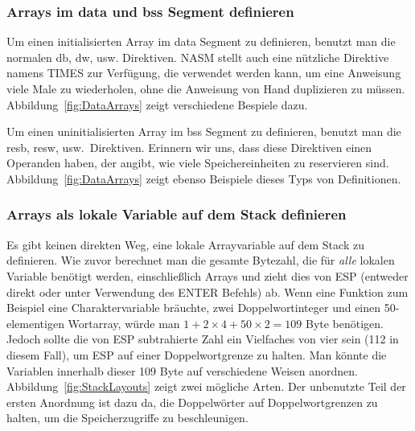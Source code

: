 \subsubsection{Arrays im {\code data} und {\code bss} Segment definieren
}

Um einen initialisierten Array im {\code data} Segment zu
definieren, benutzt man die normalen {\code db}, {\code dw}, usw.\/
Direktiven. NASM stellt auch eine
n\"{u}tzliche Direktive namens {\code TIMES}  zur
Verf\"{u}gung, die verwendet werden kann, um eine Anweisung viele Male
zu wiederholen, ohne die Anweisung von Hand duplizieren zu m\"{u}ssen.
Abbildung~\ref{fig:DataArrays} zeigt verschiedene Bespiele dazu.

Um einen uninitialisierten Array im {\code bss} Segment zu
definieren, benutzt man die {\code resb}, {\code resw},
 usw.\ Direktiven. Erinnern wir uns,
dass diese Direktiven einen Operanden haben, der angibt, wie viele
Speichereinheiten zu reservieren sind.
Abbildung~\ref{fig:DataArrays} zeigt ebenso Beispiele dieses Typs
von Definitionen.

\subsubsection{Arrays als lokale Variable auf dem Stack definieren
}

Es gibt keinen direkten Weg, eine lokale Arrayvariable auf dem Stack
zu definieren. Wie zuvor berechnet man die gesamte Bytezahl, die f\"{u}r
\emph{alle} lokalen Variable ben\"{o}tigt werden, einschlie{\ss}lich Arrays
und zieht dies von ESP (entweder direkt oder unter Verwendung des
{\code ENTER} Befehls) ab. Wenn eine Funktion zum Beispiel eine
Charaktervariable br\"{a}uchte, zwei Doppelwortinteger und einen
50-elementigen Wortarray, w\"{u}rde man  $1 + 2 \times 4 + 50 \times 2 =
109$ Byte ben\"{o}tigen. Jedoch sollte die von ESP subtrahierte Zahl ein
Vielfaches von vier sein (112 in diesem Fall), um ESP auf einer
Doppelwortgrenze zu halten. Man k\"{o}nnte die Variablen innerhalb
dieser 109 Byte auf verschiedene Weisen anordnen.
Abbildung~\ref{fig:StackLayouts} zeigt zwei m\"{o}gliche Arten. Der
unbenutzte Teil der ersten Anordnung ist dazu da, die Doppelw\"{o}rter
auf Doppelwortgrenzen zu halten, um die Speicherzugriffe zu
beschleunigen. 

